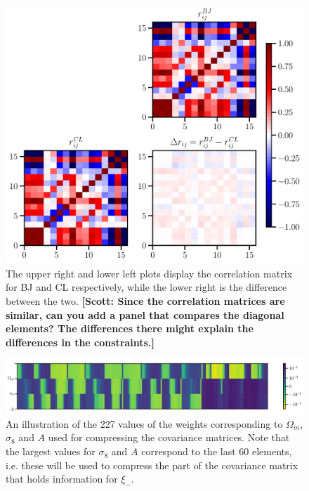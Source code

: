 \documentclass[twocolumn]{\docclass}
\newcommand\scott[1]{{\bf [Scott: #1]}}
\begin{document}
	\begin{figure}
		\includegraphics[width=0.9\columnwidth]{Correlation_compression.pdf}
		\caption{The upper right and lower left plots display the correlation matrix for BJ and CL respectively, while the lower right is the difference between the two. \scott{Since the correlation matrices are similar, can you add a panel that compares the diagonal elements? The differences there might explain the differences in the constraints.} \label{fig:correlation}}
	\end{figure}

	\begin{figure}
	\includegraphics[width=2\columnwidth]{Weights.pdf}
	\caption{An illustration of the 227 values of the weights corresponding to $\Omega_m$, $\sigma_8$ and $A$ used for compressing the covariance matrices. Note that the largest values for $\sigma_8$ and $A$ correspond to the last 60 elements, i.e. these will be used to compress the part of the covariance matrix that holds information for $\xi_-$.} \label{fig:weight2pt}
	\end{figure}
	
	
	
\end{document}
